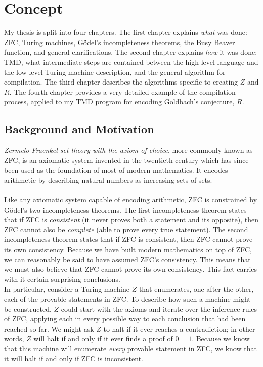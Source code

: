 \chapter{Concept}

My thesis is split into four chapters. The first chapter explains \emph{what} was done: ZFC, Turing machines, G\"{o}del's incompleteness theorems, the Busy Beaver function, and general clarifications. The second chapter explains \emph{how} it was done: TMD, what intermediate steps are contained between the high-level language and the low-level Turing machine description, and the general algorithm for compilation. The third chapter describes the algorithms specific to creating $Z$ and $R$. The fourth chapter provides a very detailed example of the compilation process, applied to my TMD program for encoding Goldbach's conjecture, $R$.

\section{Background and Motivation \label{sec:background}}

\emph{Zermelo-Fraenkel set theory with the axiom of choice}, more commonly known as ZFC, is an axiomatic system invented in the twentieth century which has since been used as the foundation of most of modern mathematics. It encodes arithmetic by describing natural numbers as increasing sets of sets. \\
\\
Like any axiomatic system capable of encoding arithmetic, ZFC is constrained by G\"{o}del's two incompleteness theorems. The first incompleteness theorem states that if ZFC is \emph{consistent} (it never proves both a statement and its opposite), then ZFC cannot also be \emph{complete} (able to prove every true statement). The second incompleteness theorem states that if ZFC is consistent, then ZFC cannot prove its own consistency. Because we have built modern mathematics on top of ZFC, we can reasonably be said to have assumed ZFC's consistency. This means that we must also believe that ZFC cannot prove its own consistency. This fact carries with it certain surprising conclusions. \\

In particular, consider a Turing machine $Z$ that enumerates, one after the other, each of the provable statements in ZFC. To describe how such a machine might be constructed, $Z$ could start with the axioms and iterate over the inference rules of ZFC, applying each in every possible way to each conclusion that had been reached so far. We might ask $Z$ to halt if it ever reaches a contradiction; in other words, $Z$ will halt if and only if it ever finds a proof of $0 = 1$. Because we know that this machine will enumerate \emph{every} provable statement in ZFC, we know that it will halt if and only if ZFC is inconsistent. \\


